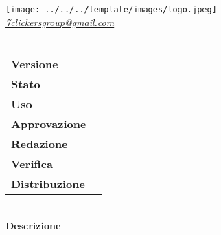 \thispagestyle{empty}
\renewcommand{\arraystretch}{1.3}

\begin{titlepage}
	\begin{center}
		
	\texttt{[image: ../../../template/images/logo.jpeg]}
	\\[1cm]
	\href{mailto:7clickersgroup@gmail.com}		      	
	{\large{\textit{7clickersgroup@gmail.com} } }\\[2.5cm]
	\Huge \textbf{\doctitle} \\[1cm]
	 \large
			 \begin{tabular}{M{3cm}|M{3cm}}
                        \textbf{Versione} & \rev{} \\
                        \textbf{Stato} & \stato{} \\
                        \textbf{Uso} & \uso{} \\                         
                        \textbf{Approvazione} & \approv{} \\                      
                        \textbf{Redazione} & \red{} \\ 
                        \textbf{Verifica} &  \ver{} \\                         
                        \textbf{Distribuzione} & \parbox[t]{5cm}{ \dest{} }
                \end{tabular} 
                \\[7cm]
                \large \textbf{Descrizione} \\ \describedoc{} 
     \end{center}
\end{titlepage}